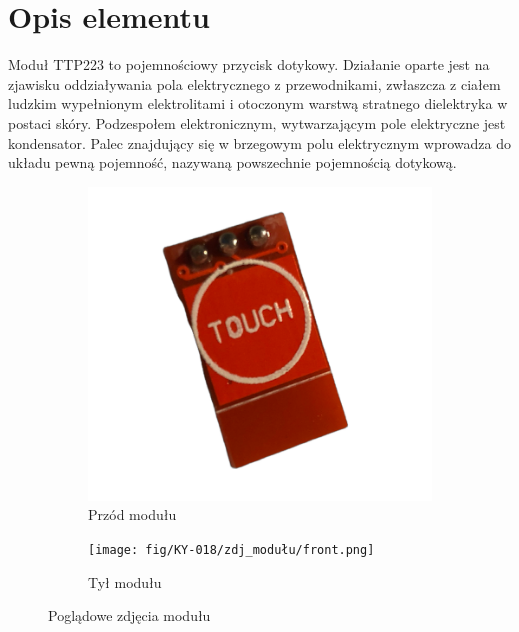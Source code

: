 \documentclass[11pt, a4paper]{article}
\author{Antoni Borowski}
\institute{Instytut Robotyki i Inteligencji Maszynowej}
\begin{document}
\newpage

\section*{Opis elementu} 
Moduł TTP223 to pojemnościowy przycisk dotykowy. Działanie oparte jest na zjawisku oddziaływania pola elektrycznego z przewodnikami, zwłaszcza z ciałem ludzkim wypełnionym elektrolitami i otoczonym warstwą stratnego dielektryka w postaci skóry. Podzespołem elektronicznym, wytwarzającym pole elektryczne jest kondensator. Palec znajdujący się w brzegowym polu elektrycznym wprowadza do układu pewną pojemność, nazywaną powszechnie pojemnością dotykową. 
\vspace{0.5cm}
\begin{figure}[h!]
\centering
\begin{subfigure}{.5\textwidth}
  \centering
  \includegraphics[width=0.6\linewidth]{fig/KY-018/zdj_modułu/tył.png}
  \caption{Przód modułu}
  \label{fig:sub1}
\end{subfigure}%
\begin{subfigure}{.5\textwidth}
  \centering
  \texttt{[image: fig/KY-018/zdj\_modułu/front.png]}
  \caption{Tył modułu}
  \label{fig:sub2}
\end{subfigure}
\caption{Poglądowe zdjęcia modułu}
\label{fig:test}
\end{figure}
\end{document}
